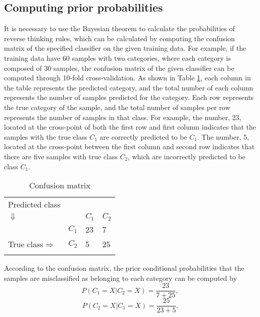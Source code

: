 \subsection{Computing prior probabilities}
It is necessary to use the Bayesian theorem to calculate the probabilities of reverse thinking rules, which can be calculated by computing the confusion matrix of the specified classifier on the given training data. For example, if the training data have 60 samples with two categories, where each category is composed of 30 samples, the confusion matrix of the given classifier can be computed through 10-fold cross-validation. As shown in Table \ref{Table1}, each column in the table represents the predicted category, and the total number of each column represents the number of samples predicted for the category. Each row represents the true category of the sample, and the total number of samples per row represents the number of samples in that class. For example, the number, 23, located at the cross-point of both the first row and first column indicates that the samples with the true class $C_1$ are correctly predicted to be $C_1$. The number, 5, located at the cross-point between the first column and second row indicates that there are five samples with true class $C_2$, which are incorrectly predicted to be class $C_1$.

\begin{table}[htbp]
\centering
\caption{Confusion matrix}
\label{Table1}
\begin{tabular}{llll}
\hline\noalign{\smallskip}
 Predicted class          &         &      &        \\
        $\Downarrow$      &         &$C_1$ & $C_2$  \\
\noalign{\smallskip}\hline\noalign{\smallskip}
                          & $C_1$	& 23	& 7 \\
True class$\Rightarrow$   & $C_2$	&5 	    &25\\
\noalign{\smallskip}\hline
\end{tabular}
\end{table}

According to the confusion matrix, the prior conditional probabilities that the samples are misclassified as belonging to each category can be computed by
\begin{equation}
    P(C_1=X|C_2=X)=\frac{23}{7+25},
\end{equation}
\begin{equation}
    P(C_2=X|C_1=X)=\frac{25}{23+5}.
\end{equation}

